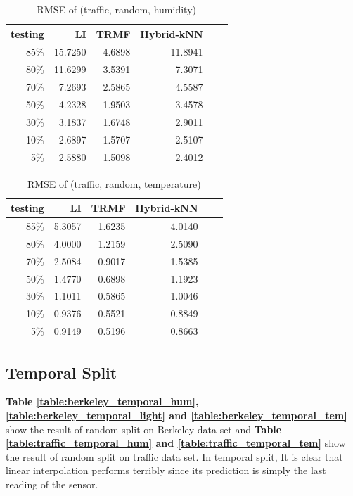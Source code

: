 \begin{table} [htbp]
\centering
\caption{RMSE of (traffic, random, humidity)}
\label{table:traffic_random_hum}
\begin{tabular}{ r | r r r r r}
	testing	&LI	&TRMF	&Hybrid-kNN \\ \hline
	85\%	&15.7250	&4.6898	&11.8941\\ 
	80\%	&11.6299	&3.5391	&7.3071\\
	70\%	& 7.2693	&2.5865	&4.5587\\
	50\%	& 4.2328	&1.9503	&3.4578\\
	30\%	& 3.1837	&1.6748	&2.9011\\
	10\%	& 2.6897	&1.5707	&2.5107\\
	 5\%	& 2.5880	&1.5098	&2.4012\\
\end{tabular}
\end{table}

\begin{table} [htbp]
\centering
\caption{RMSE of (traffic, random, temperature)}
\label{table:traffic_random_tem}
\begin{tabular}{ r | r r r r r}
	testing	&LI	&TRMF	&Hybrid-kNN \\ \hline
	85\%	&5.3057	&1.6235	&4.0140\\ 
	80\%	&4.0000	&1.2159	&2.5090\\
	70\%	&2.5084	&0.9017	&1.5385\\
	50\%	&1.4770	&0.6898	&1.1923\\
	30\%	&1.1011	&0.5865	&1.0046\\
	10\%	&0.9376	&0.5521	&0.8849\\
	 5\%	&0.9149	&0.5196	&0.8663\\
\end{tabular}
\end{table}

\subsection{Temporal Split}
\textbf{Table \ref{table:berkeley_temporal_hum}, \ref{table:berkeley_temporal_light} and \ref{table:berkeley_temporal_tem}} show the result of random split on Berkeley data set and \textbf{Table \ref{table:traffic_temporal_hum} and \ref{table:traffic_temporal_tem}} show the result of random split on traffic data set. In temporal split,  It is clear that linear interpolation performs terribly since its prediction is simply the last reading of the sensor.

